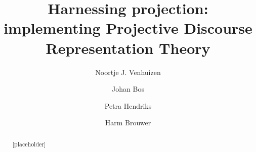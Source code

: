 \documentclass[10pt,a4paper]{article}
\title{Harnessing projection: implementing Projective Discourse Representation Theory}
\author{
  Noortje J. Venhuizen \and
  Johan Bos \and
  Petra Hendriks \and
  Harm Brouwer
}
\theoremstyle{definition}
\begin{document}
\maketitle

\begin{abstract} 
  [placeholder]
\end{abstract}

\tableofcontents %













\clearpage %


\end{document}
